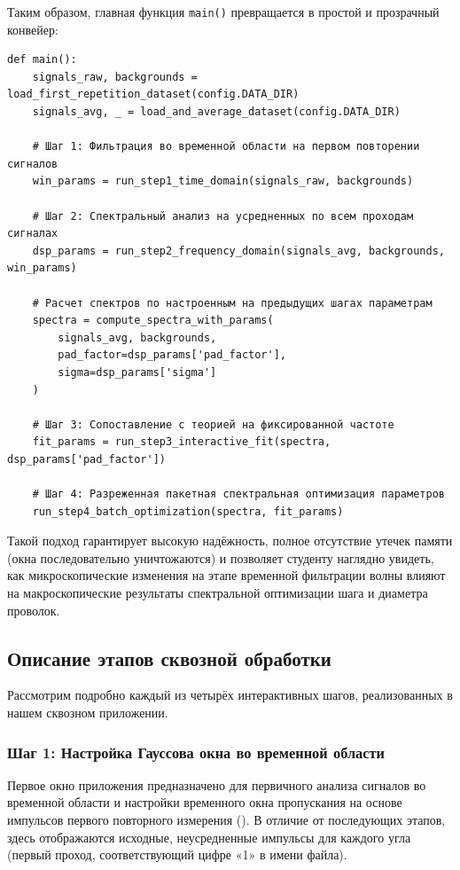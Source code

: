 Таким образом, главная функция \texttt{main()} превращается в простой и прозрачный конвейер:
\begin{verbatim}
def main():
    signals_raw, backgrounds = load_first_repetition_dataset(config.DATA_DIR)
    signals_avg, _ = load_and_average_dataset(config.DATA_DIR)
    
    # Шаг 1: Фильтрация во временной области на первом повторении сигналов
    win_params = run_step1_time_domain(signals_raw, backgrounds)
    
    # Шаг 2: Спектральный анализ на усредненных по всем проходам сигналах
    dsp_params = run_step2_frequency_domain(signals_avg, backgrounds, win_params)
    
    # Расчет спектров по настроенным на предыдущих шагах параметрам
    spectra = compute_spectra_with_params(
        signals_avg, backgrounds, 
        pad_factor=dsp_params['pad_factor'], 
        sigma=dsp_params['sigma']
    )
    
    # Шаг 3: Сопоставление с теорией на фиксированной частоте
    fit_params = run_step3_interactive_fit(spectra, dsp_params['pad_factor'])
    
    # Шаг 4: Разреженная пакетная спектральная оптимизация параметров
    run_step4_batch_optimization(spectra, fit_params)
\end{verbatim}

Такой подход гарантирует высокую надёжность, полное отсутствие утечек памяти (окна последовательно уничтожаются) и позволяет студенту наглядно увидеть, как микроскопические изменения на этапе временной фильтрации волны влияют на макроскопические результаты спектральной оптимизации шага и диаметра проволок.

\subsection{Описание этапов сквозной обработки}

Рассмотрим подробно каждый из четырёх интерактивных шагов, реализованных в нашем сквозном приложении.

\subsubsection{Шаг 1: Настройка Гауссова окна во временной области}

Первое окно приложения предназначено для первичного анализа сигналов во временной области и настройки временного окна пропускания на основе импульсов первого повторного измерения (). В отличие от последующих этапов, здесь отображаются исходные, неусредненные импульсы для каждого угла (первый проход, соответствующий цифре «1» в имени файла).

